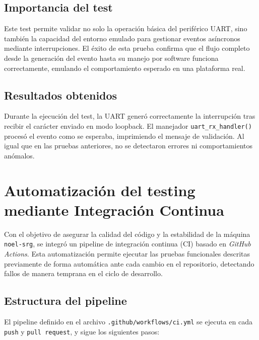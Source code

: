 \subsection*{Importancia del test}

Este test permite validar no solo la operación básica del periférico UART, sino también la capacidad del entorno emulado para gestionar eventos asíncronos mediante interrupciones. El éxito de esta prueba confirma que el flujo completo desde la generación del evento hasta su manejo por software funciona correctamente, emulando el comportamiento esperado en una plataforma real.

\subsection*{Resultados obtenidos}

Durante la ejecución del test, la UART generó correctamente la interrupción tras recibir el carácter enviado en modo loopback. El manejador \texttt{uart\_rx\_handler()} procesó el evento como se esperaba, imprimiendo el mensaje de validación. Al igual que en las pruebas anteriores, no se detectaron errores ni comportamientos anómalos.


\section{Automatización del testing mediante Integración Continua}
\label{sec:ci-testing}

Con el objetivo de asegurar la calidad del código y la estabilidad de la máquina \texttt{noel-srg}, se integró un pipeline de integración continua (CI) basado en \emph{GitHub Actions}. Esta automatización permite ejecutar las pruebas funcionales descritas previamente de forma automática ante cada cambio en el repositorio, detectando fallos de manera temprana en el ciclo de desarrollo.

\subsection*{Estructura del pipeline}

El pipeline definido en el archivo \texttt{.github/workflows/ci.yml} se ejecuta en cada \texttt{push} y \texttt{pull request}, y sigue los siguientes pasos:

